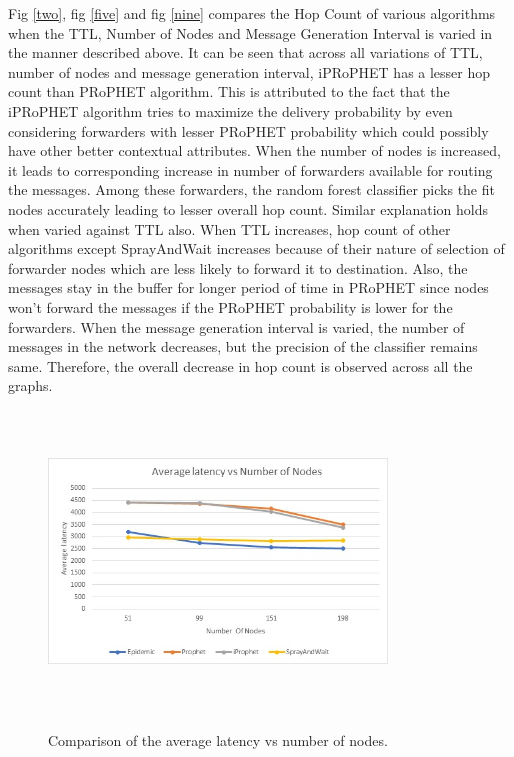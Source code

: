 \documentclass[10pt,journal]{IEEEtran}
\begin{document}
Fig \ref{two}, fig \ref{five} and fig \ref{nine} compares the Hop Count of various algorithms when the TTL, Number of Nodes and Message Generation Interval is varied in the manner described above.
It can be seen that across all variations of TTL, number of nodes and message generation interval, iPRoPHET has a lesser hop count than PRoPHET algorithm. This is attributed to the fact that the iPRoPHET algorithm tries to maximize the delivery probability by even considering forwarders with lesser PRoPHET probability which could possibly have other better contextual attributes. When the number of nodes is increased, it leads to corresponding increase in number of forwarders available for routing the messages. Among these forwarders, the random forest classifier picks the fit nodes accurately leading to lesser overall hop count. Similar explanation holds when varied against TTL also. When TTL increases, hop count of other algorithms except SprayAndWait increases because of their nature of selection of forwarder nodes which are less likely to forward it to destination. Also, the messages stay in the buffer for longer period of time in PRoPHET since nodes won’t forward the messages if the PRoPHET probability is lower for the forwarders. When the message generation interval is varied, the number of messages in the network decreases, but the precision of the classifier remains same. Therefore, the overall decrease in hop count is observed across all the graphs. 

\begin{figure}[H]
\centering
\includegraphics[width=9cm, height=8cm]{avg_lat_vs_num_of_nodes.png}\\
\caption{Comparison of the average latency vs number of nodes.}
\label{seven}
\end{figure}
\end{document}
